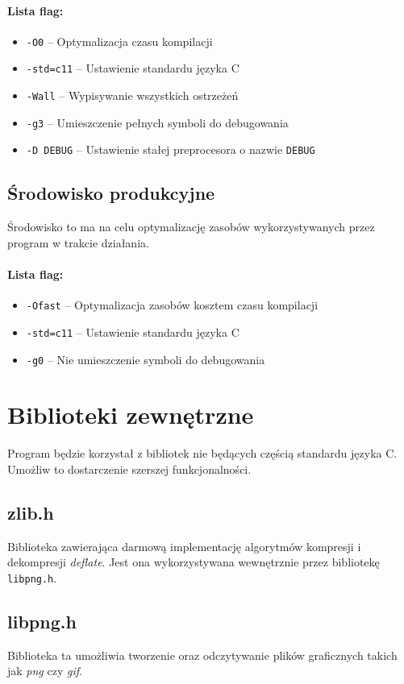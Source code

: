 \documentclass{article}
\begin{document}
\paragraph{Lista flag:}
\begin{itemize}
	\item \texttt{-O0} -- Optymalizacja czasu kompilacji
	\item \texttt{-std=c11} -- Ustawienie standardu języka C
	\item \texttt{-Wall} -- Wypisywanie wszystkich ostrzeżeń
	\item \texttt{-g3} -- Umieszczenie pełnych symboli do debugowania
	\item \texttt{-D DEBUG} -- Ustawienie stałej preprocesora o nazwie \texttt{DEBUG}
\end{itemize}

\subsection{Środowisko produkcyjne}
Środowisko to ma na celu optymalizację zasobów wykorzystywanych przez program w trakcie działania.

\paragraph{Lista flag:}
\begin{itemize}
	\item \texttt{-Ofast} -- Optymalizacja zasobów kosztem czasu kompilacji
	\item \texttt{-std=c11} -- Ustawienie standardu języka C
	\item \texttt{-g0} -- Nie umieszczenie symboli do debugowania
\end{itemize}

\section{Biblioteki zewnętrzne}
Program będzie korzystał z bibliotek nie będących częścią standardu języka C. Umożliw to dostarczenie szerszej funkcjonalności.

\subsection{zlib.h}
Biblioteka zawierająca darmową implementację algorytmów kompresji i dekompresji \textit{deflate}. Jest ona wykorzystywana wewnętrznie przez bibliotekę \texttt{libpng.h}.

\subsection{libpng.h}
Biblioteka ta umożliwia tworzenie oraz odczytywanie plików graficznych takich jak \textit{png} czy \textit{gif}.
\end{document}
